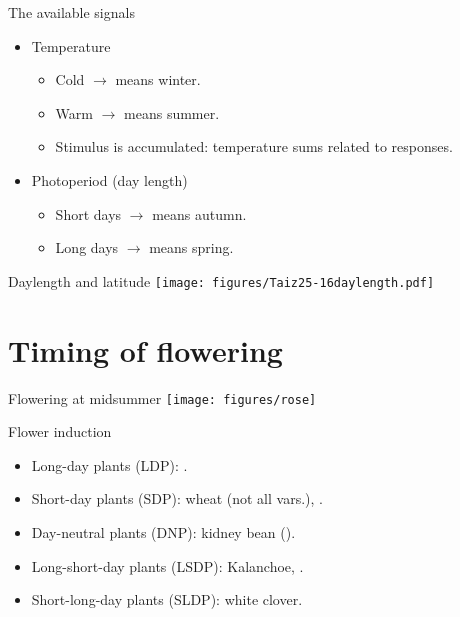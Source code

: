 \documentclass[10pt]{beamer}
\begin{document}
\begin{frame}{The available signals}
    \begin{itemize}
        \item Temperature
        \begin{itemize}
            \item Cold $\rightarrow$ means winter.
            \item Warm $\rightarrow$ means summer.
            \item Stimulus is accumulated: temperature sums related to responses.
        \end{itemize}
        \item Photoperiod (day length)
        \begin{itemize}
            \item Short days $\rightarrow$ means autumn.
            \item Long days $\rightarrow$ means spring.
        \end{itemize}
    \end{itemize}
\end{frame}

\begin{frame}{Daylength and latitude}
    \centering
    \texttt{[image: figures/Taiz25-16daylength.pdf]}\\
    {\small \autocite[from][]{TaiZei2006}}
\end{frame}

\section{Timing of flowering}

\begin{frame}{Flowering at midsummer}
    \centering
    \texttt{[image: figures/rose]}
\end{frame}

\begin{frame}{Flower induction}
    \begin{itemize}
        \item Long-day plants (LDP): .
        \item Short-day plants (SDP): wheat (not all vars.), .
        \item Day-neutral plants (DNP): kidney bean ().
        \item Long-short-day plants (LSDP): Kalanchoe, .
        \item Short-long-day plants (SLDP): white clover.
    \end{itemize}
\end{frame}
\end{document}
